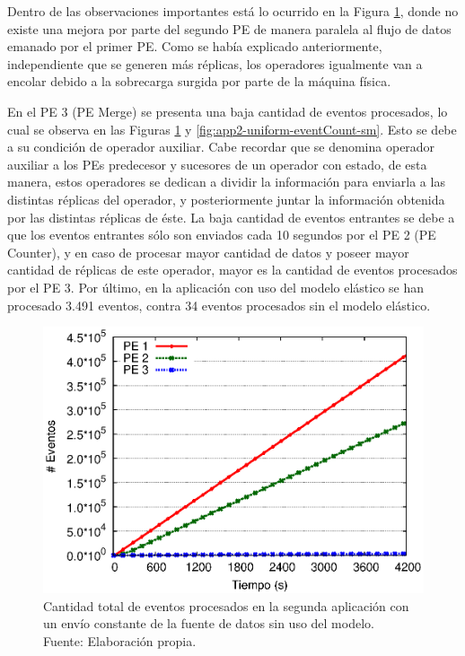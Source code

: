 Dentro de las observaciones importantes est\'a lo ocurrido en la Figura \ref{fig:app2-uniform-eventCount-cm}, donde no existe una mejora por parte del segundo PE de manera paralela al flujo de datos emanado por el primer PE. Como se hab\'ia explicado anteriormente, independiente que se generen m\'as r\'eplicas, los operadores igualmente van a encolar debido a la sobrecarga surgida por parte de la m\'aquina f\'isica.

En el PE 3 (PE Merge) se presenta una baja cantidad de eventos procesados, lo cual se observa en las Figuras \ref{fig:app2-uniform-eventCount-cm} y \ref{fig:app2-uniform-eventCount-sm}. Esto se debe a su condici\'on de operador auxiliar. Cabe recordar que se denomina operador auxiliar a los PEs predecesor y sucesores de un operador con estado, de esta manera, estos operadores se dedican a dividir la informaci\'on para enviarla a las distintas r\'eplicas del operador, y posteriormente juntar la informaci\'on obtenida por las distintas r\'eplicas de \'este. La baja cantidad de eventos entrantes se debe a que los eventos entrantes s\'olo son enviados cada 10 segundos por el PE 2 (PE Counter), y en caso de procesar mayor cantidad de datos y poseer mayor cantidad de r\'eplicas de este operador, mayor es la cantidad de eventos procesados por el PE 3. Por \'ultimo, en la aplicaci\'on con uso del modelo el\'astico se han procesado 3.491 eventos, contra 34 eventos procesados sin el modelo el\'astico.

\begin{figure}[!ht]
	\centering
	\captionsetup{justification=centering}
    \includegraphics[scale=0.7]{images/exp/app2/uniform/cm/eventCount.eps}
    \caption[Cantidad total de eventos procesados en la segunda aplicaci\'on con un env\'io constante de la fuente de datos sin uso del modelo.]{Cantidad total de eventos procesados en la segunda aplicaci\'on con un env\'io constante de la fuente de datos sin uso del modelo.\\Fuente: Elaboraci\'on propia.}
    \label{fig:app2-uniform-eventCount-cm}
\end{figure}

